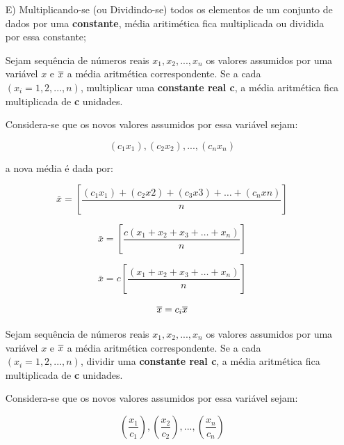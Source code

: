 \begin{enumerate}
  \item [{E)}] Multiplicando-se (ou Dividindo-se) todos os elementos
de um conjunto de dados por uma \textbf{constante}, média aritimética fica multiplicada ou dividida por essa constante;

\vskip0.3cm
\textbf{} 
\vskip0.3cm

Sejam sequência de números reais $x_{1}, x_{2},...,x_{n}$ os valores assumidos por uma variável $x$ e $\Bar{x}$ a média aritmética correspondente. Se a cada $(x_{i}=1,2,...,n)$, multiplicar uma \textbf{constante real c}, a média aritmética fica multiplicada de \textbf{c} unidades.\vskip0.3cm


Considera-se que os novos valores assumidos por essa variável sejam: 

$$(c_{1}x_{1}),(c_{2}x_{2}),...,(c_{n}x_{n})$$

a nova média é dada por:

\begin{equation*}\label{media3}
     \bar{x} =  \left[ \frac{(c_{1}x_{1})+(c_{2}x{2})+(c_{3}x{3})+\ldots+(c_{n}x{n})}{n} \right]
\end{equation*}

\begin{equation*}\label{media3}
     \bar{x} = \left[ \frac{c(x_{1}+x_{2}+x_{3}+\ldots+x_{n})}{n} \right]
\end{equation*}

\begin{equation*}\label{media3}
     \bar{x}=c \left[\frac{(x_{1}+x_{2}+x_{3}+\ldots+x_{n})}{n} \right]
\end{equation*}


\begin{equation*}\label{media3}
     \bar{x}=c_{i}\Bar{x} 
\end{equation*}



\vskip0.3cm
\textbf{} 
\vskip0.3cm

Sejam sequência de números reais $x_{1}, x_{2},...,x_{n}$ os valores assumidos por uma variável $x$ e $\Bar{x}$ a média aritmética correspondente. Se a cada $(x_{i}=1,2,...,n)$, dividir uma \textbf{constante real c}, a média aritmética fica multiplicada de \textbf{c} unidades.\vskip0.3cm


Considera-se que os novos valores assumidos por essa variável sejam: 

$$\left( \frac{x_{1}}{c_{1}} \right), \left( \frac{x_{2}}{c_{2}} \right),..., \left( \frac{x_{n}}{c_{n}}\right)$$



\end{enumerate}
